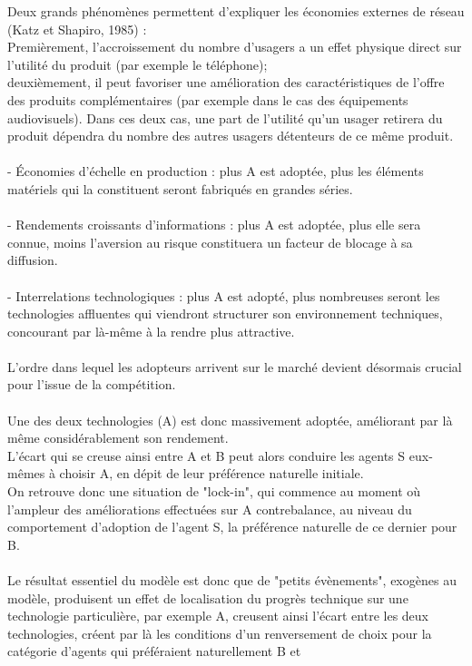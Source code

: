 \documentclass[a4paper, 10pt]{article}
\begin{document}
Deux grands phénomènes permettent d'expliquer les économies externes de réseau (Katz et Shapiro, 1985) :\\
Premièrement, l'accroissement du nombre d'usagers a un effet physique direct sur l'utilité du produit (par exemple le téléphone);\\
deuxièmement, il peut favoriser une amélioration des caractéristiques de l'offre des produits complémentaires
(par exemple dans le cas des équipements audiovisuels).
Dans ces deux cas, une part de l'utilité qu'un usager retirera du produit dépendra du
nombre des autres usagers détenteurs de ce même produit.\\ \\
- Économies d'échelle en production : plus A est adoptée, plus les éléments matériels qui la constituent seront fabriqués en grandes séries.\\ \\
- Rendements croissants d'informations : plus A est adoptée, plus elle sera connue,
moins l'aversion au risque constituera un facteur de blocage à sa diffusion.\\ \\
- Interrelations technologiques : plus A est adopté,
plus nombreuses seront les technologies affluentes qui viendront structurer son environnement techniques,
concourant par là-même à la rendre plus attractive.\\ \\
L'ordre dans lequel les adopteurs arrivent sur le marché devient désormais crucial pour l'issue de la compétition.\\ \\
Une des deux technologies (A) est donc massivement adoptée, améliorant par là même considérablement son rendement.\\
L'écart qui se creuse ainsi entre A et B peut alors conduire les agents S eux-mêmes à choisir A,
en dépit de leur préférence naturelle initiale.\\
On retrouve donc une situation de "lock-in", qui commence au moment où l'ampleur des améliorations effectuées sur A contrebalance,
au niveau du comportement d'adoption de l'agent S, la préférence naturelle de ce dernier pour B.\\ \\
Le résultat essentiel du modèle est donc que de "petits évènements", exogènes au modèle,
produisent un effet de localisation du progrès technique sur une technologie particulière, par exemple A,
creusent ainsi l'écart entre les deux technologies,
créent par là les conditions d'un renversement de choix pour la catégorie d'agents qui préféraient naturellement B et
\end{document}
